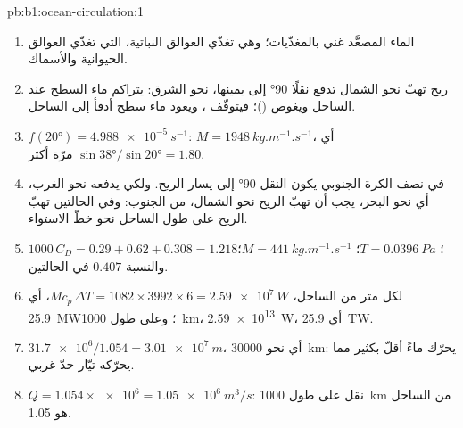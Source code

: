 \begin{solution}{pb:b1:ocean-circulation:1}
\begin{enumerate}
  \item الماء المصعَّد غني بالمغذّيات؛ وهي تغذّي العوالق النباتية، التي تغذّي العوالق الحيوانية والأسماك.
  \item ريح تهبّ نحو الشمال تدفع نقلًا \ang{90} إلى يمينها، نحو الشرق: يتراكم ماء السطح عند الساحل ويغوص ()؛ فيتوقّف ، ويعود ماء سطح أدفأ إلى الساحل.
  \item $f(\ang{20}) = \qty{4.988e-5}{s^{-1}}$: $M = \qty{1948}{kg.m^{-1}.s^{-1}}$،
        أي $\sin\ang{38}/\sin\ang{20} = 1.80$ مرّة أكثر.
  \item في نصف الكرة الجنوبي يكون النقل \ang{90} إلى يسار الريح. ولكي يدفعه نحو الغرب، أي نحو البحر، يجب أن تهبّ الريح نحو الشمال، من الجنوب: وفي الحالتين تهبّ الريح على طول الساحل نحو خطّ الاستواء.
  \item $1000\,C_D = 0.29 + 0.62 + 0.308 = 1.218$؛ $T = \qty{0.0396}{Pa}$؛ $M =
        \qty{441}{kg.m^{-1}.s^{-1}}$؛ والنسبة $0.407$ في الحالتين.
  \item لكل متر من الساحل، $M c_p\,\Delta T = 1082 \times 3992 \times 6 =
        \qty{2.59e7}{W}$، أي \qty{25.9}{MW}؛ وعلى طول \qty{1000}{km}، \qty{2.59e13}{W}،
        أي \qty{25.9}{TW}.
  \item $\num{31.7e6}/1.054 = \qty{3.01e7}{m}$، أي نحو \qty{30000}{km}: يحرّك  ماءً أقلّ بكثير مما يحرّكه تيّار حدّ غربي.
  \item $Q = 1.054 \times \num{e6} = \qty{1.05e6}{m^3/s}$: نقل  على طول \qty{1000}{km} من الساحل هو \qty{1.05}{\sverdrup}.
\end{enumerate}
\end{solution}
